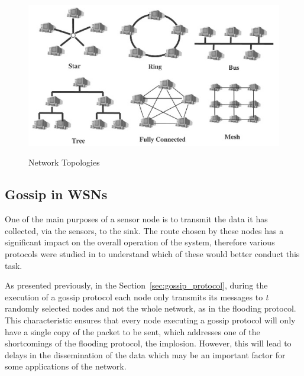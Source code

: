 \begin{figure}[H]
      \caption{Network Topologies \cite{Lewis2004}}
      \centering
      \includegraphics[scale=0.7]{Chapters/Figures/network_topologies.png}
      \label{fig:network_topologies}
\end{figure}


\subsection{Gossip in WSNs}
\label{subsec:gossip_in_wsns}
One of the main purposes of a sensor node is to transmit the data it has collected, via
the sensors, to the sink. The route chosen by these nodes has a significant impact on the
overall operation of the system, therefore various protocols were studied in \cite{Akkaya2005}
to understand which of these would better conduct this task.

As presented previously, in the Section~\ref{sec:gossip_protocol}, during the execution of a
gossip protocol each node only transmits its messages to \textit{t} randomly selected nodes
and not the whole network, as in the flooding protocol. This characteristic ensures that every
node executing a gossip protocol will only have a single copy of the packet to be sent, which
addresses one of the shortcomings of the flooding protocol, the implosion. %
However, this will lead to delays in the dissemination of the data which may be an important
factor for some applications of the network.

